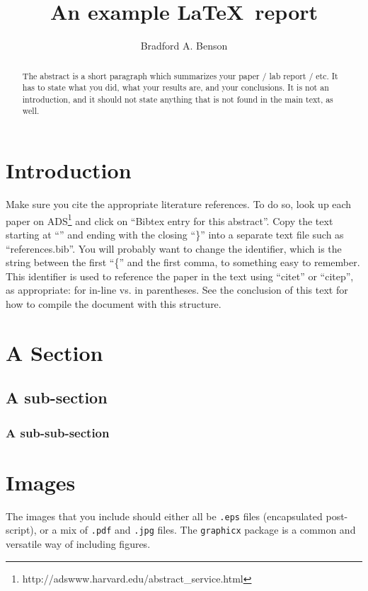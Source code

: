 \documentclass[preprint]{aastex631}
\begin{document}
\title{An example \LaTeX\ report}

\author{Bradford A. Benson}

\begin{abstract}
The abstract is a short paragraph which summarizes your paper / lab report / etc. It has to state what you did, what your results are, and your conclusions.  It is not an introduction, and it should not state anything that is not found in the main text, as well.
\end{abstract}

\section{Introduction}

Make sure you cite the appropriate literature references.  To do so, look up each paper on ADS\footnote{http://adswww.harvard.edu/abstract\_service.html} and click on ``Bibtex entry for this abstract''.  Copy the text starting at ``\@'' and ending with the closing ``\}'' into a separate text file such as ``references.bib''.  You will probably want to change the identifier, which is the string between the first ``\{'' and the first comma, to something easy to remember.  This identifier is used to reference the paper in the text using ``citet'' or ``citep'', as appropriate: \citet{dibert21} for in-line vs. \citep{guns21} in parentheses.  See the conclusion of this text for how to compile the document with this structure.

\section{A Section}

\subsection{A sub-section}

\subsubsection{A sub-sub-section}

\section{Images}

The images that you include should either all be {\tt .eps} files (encapsulated post-script), or a mix of {\tt .pdf} and {\tt .jpg} files.  The {\tt graphicx} package is a common and versatile way of including figures.
\end{document}
